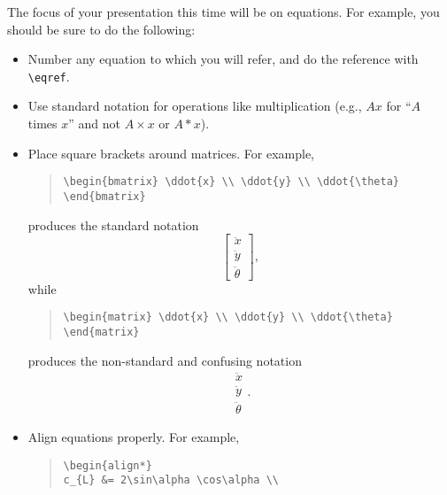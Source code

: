 \documentclass[12pt]{article}
\begin{document}
The focus of your presentation this time will be on equations. For example, you should be sure to do the following:
\begin{itemize}
\item Number any equation to which you will refer, and do the reference with \lstinline|\eqref|.
\item Use standard notation for operations like multiplication (e.g., $Ax$ for ``$A$ times $x$'' and not $A\times x$ or $A*x$).
\item Place square brackets around matrices. For example,
\begin{quote}
\begin{lstlisting}[language={[LaTeX]TeX}]
\begin{bmatrix} \ddot{x} \\ \ddot{y} \\ \ddot{\theta} \end{bmatrix}
\end{lstlisting}
\end{quote}
produces the standard notation
\begin{equation*}
\begin{bmatrix} \ddot{x} \\ \ddot{y} \\ \ddot{\theta} \end{bmatrix},
\end{equation*}
while
\begin{quote}
\begin{lstlisting}[language={[LaTeX]TeX}]
\begin{matrix} \ddot{x} \\ \ddot{y} \\ \ddot{\theta} \end{matrix}
\end{lstlisting}
\end{quote}
produces the non-standard and confusing notation
\begin{equation*}
\begin{matrix} \ddot{x} \\ \ddot{y} \\ \ddot{\theta} \end{matrix}.
\end{equation*}
\item Align equations properly. For example,
\begin{quote}
\begin{lstlisting}[language={[LaTeX]TeX}]
\begin{align*}
c_{L} &= 2\sin\alpha \cos\alpha \\ 

\end{lstlisting}
\end{quote}
\end{itemize}
\end{document}
